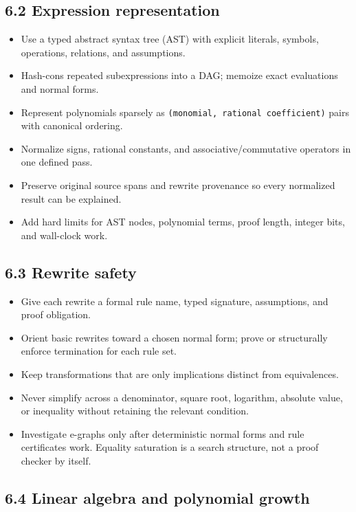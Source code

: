 \documentclass[
  10pt,
]{article}
\providecommand{\tightlist}{%
  \setlength{\itemsep}{0pt}\setlength{\parskip}{0pt}}
\begin{document}
\subsection{6.2 Expression
representation}\label{expression-representation}

\begin{itemize}
\tightlist
\item
  Use a typed abstract syntax tree (AST) with explicit literals,
  symbols, operations, relations, and assumptions.
\item
  Hash-cons repeated subexpressions into a DAG; memoize exact
  evaluations and normal forms.
\item
  Represent polynomials sparsely as
  \texttt{(monomial,\ rational\ coefficient)} pairs with canonical
  ordering.
\item
  Normalize signs, rational constants, and associative/commutative
  operators in one defined pass.
\item
  Preserve original source spans and rewrite provenance so every
  normalized result can be explained.
\item
  Add hard limits for AST nodes, polynomial terms, proof length, integer
  bits, and wall-clock work.
\end{itemize}

\subsection{6.3 Rewrite safety}\label{rewrite-safety}

\begin{itemize}
\tightlist
\item
  Give each rewrite a formal rule name, typed signature, assumptions,
  and proof obligation.
\item
  Orient basic rewrites toward a chosen normal form; prove or
  structurally enforce termination for each rule set.
\item
  Keep transformations that are only implications distinct from
  equivalences.
\item
  Never simplify across a denominator, square root, logarithm, absolute
  value, or inequality without retaining the relevant condition.
\item
  Investigate e-graphs only after deterministic normal forms and rule
  certificates work. Equality saturation is a search structure, not a
  proof checker by itself.
\end{itemize}

\subsection{6.4 Linear algebra and polynomial
growth}\label{linear-algebra-and-polynomial-growth}
\end{document}
